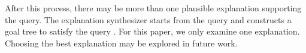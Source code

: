 \documentclass[letterpaper]{article} %
\begin{document}
After this process, there may be more than one plausible explanation
supporting the query.  The explanation synthesizer starts from the
query and constructs a goal tree to satisfy the query
\cite{leilanithesis}.  For this paper, we only examine one
explanation.  Choosing the best explanation may be explored in future
work.  








\end{document}

